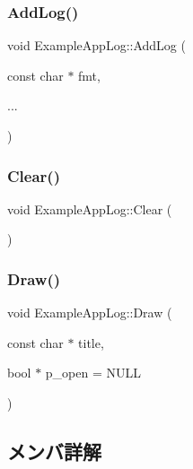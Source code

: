 \subsubsection{\texorpdfstring{Add\+Log()}{AddLog()}}
{\footnotesize\ttfamily void Example\+App\+Log\+::\+Add\+Log (\begin{DoxyParamCaption}\item[{const char $\ast$}]{fmt,  }\item[{}]{... }\end{DoxyParamCaption})\hspace{0.3cm}{\ttfamily [inline]}}

\mbox{\label{struct_example_app_log_ab9c298defddbb106fdfe4ab16c5eebac}} 
\subsubsection{\texorpdfstring{Clear()}{Clear()}}
{\footnotesize\ttfamily void Example\+App\+Log\+::\+Clear (\begin{DoxyParamCaption}{ }\end{DoxyParamCaption})\hspace{0.3cm}{\ttfamily [inline]}}

\mbox{\label{struct_example_app_log_a5ad3a4bdb89171b84aeaff96948a1f77}} 
\subsubsection{\texorpdfstring{Draw()}{Draw()}}
{\footnotesize\ttfamily void Example\+App\+Log\+::\+Draw (\begin{DoxyParamCaption}\item[{const char $\ast$}]{title,  }\item[{bool $\ast$}]{p\+\_\+open = {\ttfamily NULL} }\end{DoxyParamCaption})\hspace{0.3cm}{\ttfamily [inline]}}



\subsection{メンバ詳解}
\mbox{\label{struct_example_app_log_a74fb7cd7bd8c2507b41331ebb7d0e56d}} 
